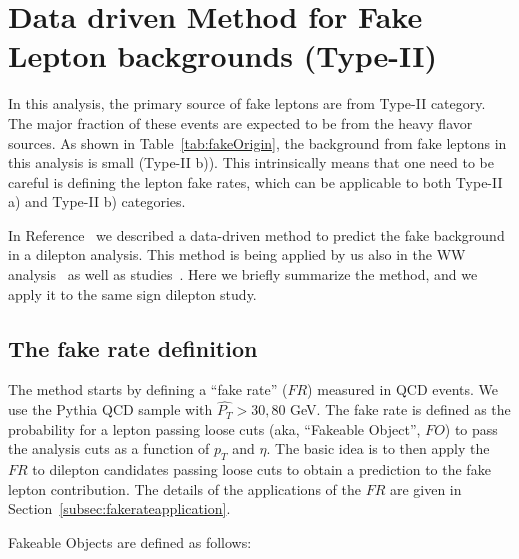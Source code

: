 \section{Data driven Method for Fake Lepton backgrounds (Type-II)}
\label{sec:leptonfake}

In this analysis, the primary source of fake leptons are from Type-II 
category. The major fraction of these events are expected to be from 
the heavy flavor sources. As shown in Table~\ref{tab:fakeOrigin}, the
background from fake leptons in this analysis is small (Type-II b)). This 
intrinsically means that one need to be careful is defining the lepton fake rates, 
which can be applicable to both Type-II a) and Type-II b) categories.

In Reference~\cite{fakelep} we described a data-driven method to predict the fake 
background in a dilepton analysis. This method is being applied by us also 
in the WW analysis~\cite{ww} as well as \ttbar studies~\cite{ttbar}. Here we briefly
summarize the method, and we apply it to the same sign dilepton study.

\subsection{The fake rate definition}
\label{subsec:fakeratedef}

The method starts by defining a “fake rate” ($FR$) measured in QCD events. We use 
the Pythia QCD sample with $\hat{P_T} > 30, 80 $ GeV. The fake rate is defined as 
the probability for a lepton passing loose cuts (aka, “Fakeable Object”, $FO$) to pass the 
analysis cuts as a function of $p_T$ and $\eta$. The basic idea is to then apply the $FR$ to 
dilepton candidates passing loose cuts to obtain a prediction to the fake lepton contribution. 
The details of the applications of the $FR$ are given in Section~\ref{subsec:fakerateapplication}. 

Fakeable Objects are defined as follows:

